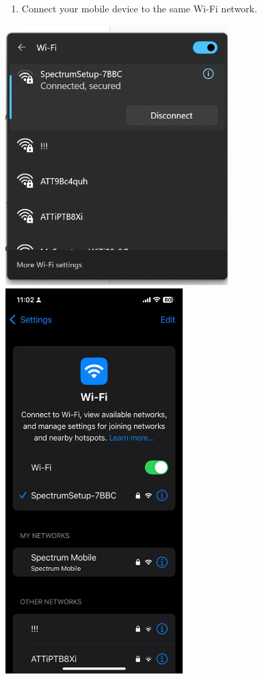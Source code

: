 \documentclass{article}
\begin{document}
\begin{enumerate}
    \item Connect your mobile device to the same Wi-Fi network.
\end{enumerate}
\includegraphics[width=3.38839in,height=3.95313in]{media/image17.png}
\includegraphics[width=2.70173in,height=5.85938in]{media/image19.jpg}
\end{document}
